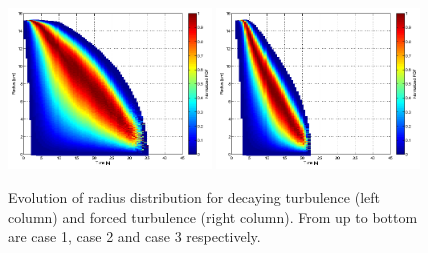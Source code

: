 \documentclass[12pt]{article}
\begin{document}
\begin{figure}[H]
\includegraphics[width=0.48\textwidth]{Figures/pdf_radius_d3}
\includegraphics[width=0.48\textwidth]{Figures/pdf_radius_f3}
\caption{Evolution of radius distribution for decaying turbulence (left column) 
and forced turbulence (right column). From up to bottom are case 1, case 2 and case 3 respectively.}\label{fig:rad_distri}
\end{figure}
\end{document}
